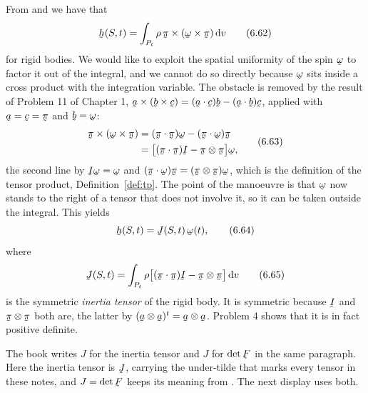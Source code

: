 From  and  we have that
\begin{equation}
   \bh(S,t)=\int_{P_{t}}\rho\,\vek\pi\times(\bom\times\vek\pi)\,\dl v
   \tag{6.62}\label{eq:6.62}
\end{equation}
for rigid bodies. We would like to exploit the spatial uniformity of
the spin $\bom$ to factor it out of the integral, and we cannot do so
directly because $\bom$ sits inside a cross product with the
integration variable. The obstacle is removed by the result of Problem
11 of Chapter 1, $\ba\times(\bb\times\bc)=(\ip\ba\bc)\bb-(\ip\ba\bb)
\bc$, applied with $\ba=\bc=\vek\pi$ and $\bb=\bom$:
\begin{equation}
\begin{aligned}
   \vek\pi\times(\bom\times\vek\pi)
   &=(\ip{\vek\pi}{\vek\pi})\bom-(\ip{\vek\pi}\bom)\vek\pi\\
   &=\big[(\ip{\vek\pi}{\vek\pi})\I-\vek\pi\otimes\vek\pi\big]\bom ,
\end{aligned}
   \tag{6.63}\label{eq:6.63}
\end{equation}
the second line by $\I\bom=\bom$ and
$(\ip{\vek\pi}\bom)\vek\pi=(\vek\pi\otimes\vek\pi)\bom$, which is the
definition of the tensor product, Definition~\ref{def:tp}. The point of
the manoeuvre is that $\bom$ now stands to the right of a tensor that
does not involve it, so it can be taken outside the integral. This
yields
\begin{equation}
   \bh(S,t)=\vek{J}(S,t)\,\bom(t),
   \tag{6.64}\label{eq:6.64}
\end{equation}
where
\begin{equation}
   \vek{J}(S,t)=\int_{P_{t}}\rho
   \big[(\ip{\vek\pi}{\vek\pi})\I-\vek\pi\otimes\vek\pi\big]\,\dl v
   \tag{6.65}\label{eq:6.65}
\end{equation}
is the symmetric \emph{inertia tensor} of the rigid body. It is
symmetric because $\I$ and $\vek\pi\otimes\vek\pi$ both are, the latter
by $(\ba\otimes\ba)^{t}=\ba\otimes\ba$. Problem 4 shows that it is in
fact positive definite.

\begin{remark}\label{rem:ch6Jclash}
The book writes $J$ for the inertia tensor and $J$ for
$\det\bF$ in the same paragraph. Here the inertia tensor is
$\vek{J}$, carrying the under-tilde that marks every tensor in these
notes, and $J=\det\bF$ keeps its meaning from . The next
display uses both.
\end{remark}

